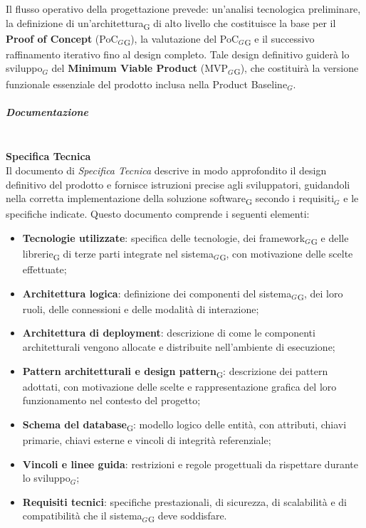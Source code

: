 \documentclass[a4paper, 10pt]{article}
\begin{document}
Il flusso operativo della progettazione prevede: un'analisi tecnologica preliminare, la definizione di un'architettura\textsubscript{G} di alto livello che costituisce la base per il \textbf{Proof of Concept} (PoC$_G$\textsubscript{G}), la valutazione del PoC$_G$\textsubscript{G} e il successivo raffinamento iterativo fino al design completo. Tale design definitivo guiderà lo sviluppo$_G$ del \textbf{Minimum Viable Product} (MVP$_G$\textsubscript{G}), che costituirà la versione funzionale essenziale del prodotto inclusa nella Product Baseline$_G$.

\subparagraph{Documentazione}~\\

\textbf{Specifica Tecnica}~\\

Il documento di \textit{Specifica Tecnica} descrive in modo approfondito il design definitivo del prodotto e fornisce istruzioni precise agli sviluppatori, guidandoli nella corretta implementazione della soluzione software\textsubscript{G} secondo i requisiti$_G$ e le specifiche indicate. Questo documento comprende i seguenti elementi:

\begin{itemize}
    \item \textbf{Tecnologie utilizzate}: specifica delle tecnologie, dei framework$_G$\textsubscript{G} e delle librerie\textsubscript{G} di terze parti integrate nel sistema$_G$\textsubscript{G}, con motivazione delle scelte effettuate;
    \item \textbf{Architettura logica}: definizione dei componenti del sistema$_G$\textsubscript{G}, dei loro ruoli, delle connessioni e delle modalità di interazione;
    \item \textbf{Architettura di deployment}: descrizione di come le componenti architetturali vengono allocate e distribuite nell'ambiente di esecuzione;
    \item \textbf{Pattern architetturali e design pattern}\textsubscript{G}: descrizione dei pattern adottati, con motivazione delle scelte e rappresentazione grafica del loro funzionamento nel contesto del progetto;
    \item \textbf{Schema del database}\textsubscript{G}: modello logico delle entità, con attributi, chiavi primarie, chiavi esterne e vincoli di integrità referenziale;
    \item \textbf{Vincoli e linee guida}: restrizioni e regole progettuali da rispettare durante lo sviluppo$_G$;
    \item \textbf{Requisiti tecnici}: specifiche prestazionali, di sicurezza, di scalabilità e di compatibilità che il sistema$_G$\textsubscript{G} deve soddisfare.
\end{itemize}
\end{document}
